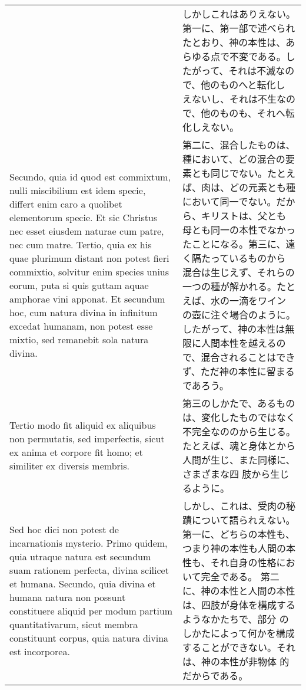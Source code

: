 \documentclass[10pt]{jsarticle} %
\begin{document}
\begin{longtable}{p{21em}p{21em}}
&


しかしこれはありえない。第一に、第一部で述べられたとおり、神の本性は、あ
 らゆる点で不変である。したがって、それは不滅なので、他のものへと転化し
 えないし、それは不生なので、他のものも、それへ転化しえない。


\\


Secundo, quia id quod est commixtum, nulli miscibilium
est idem specie, differt enim caro a quolibet elementorum specie. Et sic
Christus nec esset eiusdem naturae cum patre, nec cum matre. Tertio,
quia ex his quae plurimum distant non potest fieri commixtio, solvitur
enim species unius eorum, puta si quis guttam aquae amphorae vini
apponat. Et secundum hoc, cum natura divina in infinitum excedat
humanam, non potest esse mixtio, sed remanebit sola natura
divina. 

&

第二に、混合したものは、種において、どの混合の要素とも同じでない。たとえ
 ば、肉は、どの元素とも種において同一でない。だから、キリストは、父とも
 母とも同一の本性でなかったことになる。第三に、遠く隔たっているものから
 混合は生じえず、それらの一つの種が解かれる。たとえば、水の一滴をワイン
 の壺に注ぐ場合のように。したがって、神の本性は無限に人間本性を越えるの
 で、混合されることはできず、ただ神の本性に留まるであろう。

\\


Tertio modo fit aliquid ex aliquibus non permutatis, sed
imperfectis, sicut ex anima et corpore fit homo; et similiter ex
diversis membris. 


&

第三のしかたで、あるものは、変化したものではなく不完全なののから生じる。
 たとえば、魂と身体とから人間が生じ、また同様に、さまざまな四
 肢から生じるように。


\\


Sed hoc dici non potest de incarnationis
mysterio. Primo quidem, quia utraque natura est secundum suam rationem
perfecta, divina scilicet et humana. Secundo, quia divina et humana
natura non possunt constituere aliquid per modum partium
quantitativarum, sicut membra constituunt corpus, quia natura divina est
incorporea. 


&


しかし、これは、受肉の秘蹟について語られえない。第一に、どちらの本性も、
つまり神の本性も人間の本性も、それ自身の性格において完全である。
第二に、神の本性と人間の本性は、四肢が身体を構成するようなかたちで、部分
 のしかたによって何かを構成することができない。それは、神の本性が非物体
 的だからである。



\end{longtable}
\end{document}
